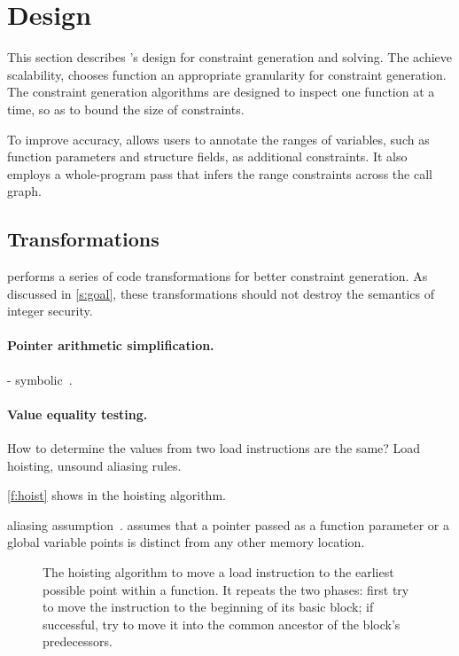 \section{Design}
\label{s:gen}

This section describes \sys's design for constraint generation and
solving.  The achieve scalability, \sys chooses function an appropriate
granularity for constraint generation.  The constraint generation
algorithms are designed to inspect one function at a time, so as
to bound the size of constraints.

To improve accuracy, \sys allows users to annotate the ranges of
variables, such as function parameters and structure fields, as
additional constraints. It also employs a whole-program pass that
infers the range constraints across the call graph.

\subsection{Transformations}

\sys performs a series of code transformations for better constraint
generation.  As discussed in \autoref{s:goal}, these transformations
should not destroy the semantics of integer security.

\paragraph{Pointer arithmetic simplification.}
- symbolic~\cite{engelen:symbolic}.

\paragraph{Value equality testing.}
How to determine the values from two load instructions
are the same? Load hoisting, unsound aliasing rules.

\autoref{f:hoist} shows in the hoisting algorithm.

aliasing assumption~\cite{livshits:ipssa}.
\sys assumes that a pointer passed as a function parameter or a
global variable points is distinct from any other memory location.


\begin{figure}

\caption{The hoisting algorithm to move a load instruction to the
earliest possible point within a function.  It repeats the two
phases: first try to move the instruction to the beginning of its
basic block; if successful, try to move it into the common ancestor
of the block's predecessors.}
\label{f:hoist}
\end{figure}

